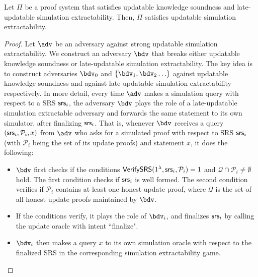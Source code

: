 \begin{lemma}
	Let $\Pi$ be a proof system that satisfies updatable knowledge soundness and late-updatable simulation extractability. Then, $\Pi$
	satisfies updatable simulation extractability.
\end{lemma}
\begin{proof}
	Let $\adv$ be an adversary against strong updatable simulation extractability. We construct an adversary $\bdv$ that breaks either updatable knowledge soundness or late-updatable simulation extractability.
	The key idea is to construct adversaries $\bdv_0$ and $\{\bdv_1, \bdv_2\ldots \}$ against updatable knowledge soundness and against late-updatable simulation extractability respectively. 
	In more detail, every time $\adv$ makes a simulation query with respect to a SRS $\mathsf{srs}_i$, the adversary $\bdv$ plays the role of a late-updatable simulation extractable adversary and forwards the same  
	statement to its own simulator, after finalizing $\mathsf{srs}_i$. 
	That is, whenever $\bdv$ receives a query $(\mathsf{srs}_i, \mathcal{P}_i, x)$ from $\adv$ who asks for a simulated proof with respect to SRS $\mathsf{srs}_i$ (with $\mathcal{P}_i$ being the set of its update proofs) and statement $x$, it does the following: 
	
	\begin{itemize}
		\item 
		$\bdv$ first checks if the conditions
		$\textsf{VerifySRS}(1^\lambda,\mathsf{srs}_i, \mathcal{P}_i) = 1$ and $\mathcal{Q} \cap \mathcal{P}_i \neq \emptyset$ hold. The first condition checks if $\mathsf{srs}_i$ is well formed. The second condition verifies if $\mathcal{P}_i$ contains at least
		one honest update proof, where $\mathcal{Q}$ is the set of all honest update proofs maintained by $\bdv$. 
		\item If the conditions verify, it plays the role of $\bdv_i$, and finalizes $\mathsf{srs}_i$ by calling the update oracle with intent ``finalize". 
		
		\item
		$\bdv_i$ then makes a query $x$ to its own simulation oracle with respect to the finalized SRS in the corresponding simulation extractability game.
		

\end{itemize}
\end{proof}
